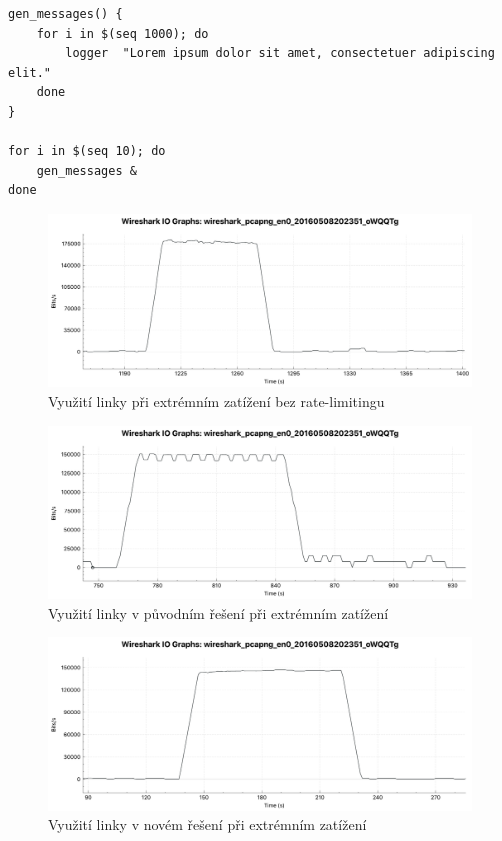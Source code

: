 \documentclass[thesis=B,czech]{FITthesis}[2012/06/26]
\begin{document}
\begin{lstlisting}[style=AshStyle]
gen_messages() {
	for i in $(seq 1000); do
		logger 	"Lorem ipsum dolor sit amet, consectetuer adipiscing elit."
	done
}

for i in $(seq 10); do
	gen_messages &
done
\end{lstlisting}

\begin{figure}[H]
	\centering
	\includegraphics[scale=0.36]{images/test-rateLim-rsyslog-Buff-off}
	\caption[Využití linky při extrémním zatížení bez rate-limitingu]{Využití linky při extrémním zatížení bez rate-limitingu}
\end{figure}
\begin{figure}[H]
	\centering
	\includegraphics[scale=0.36]{images/test-rateLim-syslogd}
	\caption[Využití linky v původním řešení při extrémním zatížení]{Využití linky v původním řešení při extrémním zatížení}
\end{figure}
\begin{figure}[H]
	\centering
	\includegraphics[scale=0.36]{images/test-rateLim-rsyslog}
	\caption[Využití linky v novém řešení při extrémním zatížení]{Využití linky v novém řešení při extrémním zatížení}
\end{figure}
\end{document}
